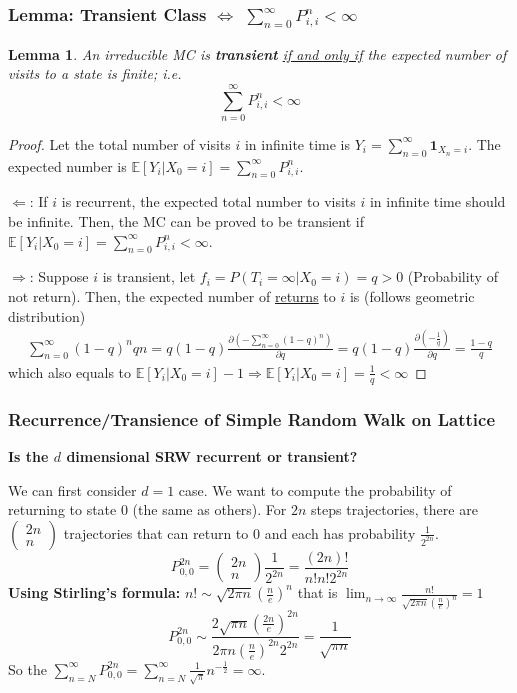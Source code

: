 \documentclass[11pt,a4paper]{article}
\newtheorem{lemma}{Lemma}
\begin{document}
\subsubsection{Lemma: Transient Class $\Leftrightarrow$ $\sum_{n=0}^\infty P_{i,i}^n<\infty$}
\begin{lemma}
    An irreducible MC is \textbf{transient} \underline{if and only if} the expected number of visits to a state is finite; i.e. $$\sum_{n=0}^\infty P_{i,i}^n<\infty$$
\end{lemma}
\begin{proof}
    Let the total number of visits $i$ in infinite time is $Y_i=\sum_{n=0}^\infty \mathbf{1}_{X_n=i}$. The expected number is $\mathbb{E}[Y_i|X_0=i]=\sum_{n=0}^\infty P_{i,i}^n$.
    
    $\Leftarrow$: If $i$ is recurrent, the expected total number to visits $i$ in infinite time should be infinite.
    Then, the MC can be proved to be transient if $\mathbb{E}[Y_i|X_0=i]=\sum_{n=0}^\infty P_{i,i}^n<\infty$.

    $\Rightarrow$: Suppose $i$ is transient, let $f_i=P(T_i=\infty|X_0=i)=q>0$ (Probability of not return). Then, the expected number of \underline{returns} to $i$ is (follows geometric distribution)
    \begin{equation}
        \begin{aligned}
            \sum_{n=0}^\infty (1-q)^nqn=q(1-q)\frac{\partial \left(-\sum_{n=0}^\infty(1-q)^n\right)}{\partial q}=q(1-q)\frac{\partial \left(-\frac{1}{q}\right)}{\partial q}=\frac{1-q}{q}
        \end{aligned}
        \nonumber
    \end{equation}
    which also equals to $\mathbb{E}[Y_i|X_0=i]-1 \Rightarrow \mathbb{E}[Y_i|X_0=i]=\frac{1}{q}<\infty$
\end{proof}

\subsubsection{Recurrence/Transience of Simple Random Walk on Lattice}
\textbf{Is the $d$ dimensional SRW recurrent or transient?}

We can first consider $d=1$ case. We want to compute the probability of returning to state $0$ (the same as others). For $2n$ steps trajectories, there are $\begin{pmatrix}
    2n\\
    n
\end{pmatrix}$ trajectories that can return to $0$ and each has probability $\frac{1}{2^{2n}}$.
$$P_{0,0}^{2n}=\begin{pmatrix}
    2n\\
    n
\end{pmatrix}\frac{1}{2^{2n}}=\frac{(2n)!}{n!n!2^{2n}}$$
\textbf{Using Stirling's formula:} $n!\sim\sqrt{2\pi n}\left(\frac{n}{e}\right)^n$ that is $\lim_{n \rightarrow \infty}\frac{n!}{\sqrt{2\pi n}\left(\frac{n}{e}\right)^n}=1$
$$P_{0,0}^{2n}\sim\frac{2\sqrt{\pi n}\left(\frac{2n}{e}\right)^{2n}}{2\pi n\left(\frac{n}{e}\right)^{2n}2^{2n}}=\frac{1}{\sqrt{\pi n}}$$
So the $\sum_{n=N}^\infty P_{0,0}^{2n}=\sum_{n=N}^\infty\frac{1}{\sqrt{\pi}}n^{-\frac{1}{2}}=\infty$.
\end{document}
